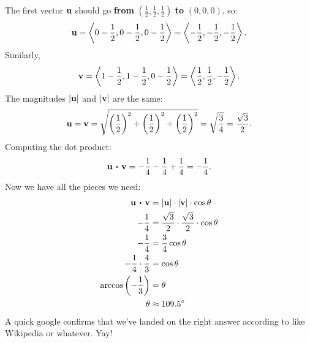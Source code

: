 \begin{enumerate}[leftmargin=0pt]
\begin{red}
    The first vector $\mathbf{u}$ should go \textbf{from} $\left(\frac{1}{2},\frac{1}{2},\frac{1}{2}\right)$  \textbf{to} $(0,0,0)$, so:
    \[\mathbf{u} = \left\langle 0 - \frac{1}{2}, 0 - \frac{1}{2}, 0 - \frac{1}{2} \right\rangle = \left\langle -\frac{1}{2},-\frac{1}{2},-\frac{1}{2}\right\rangle.\]
    Similarly, 
    \[\mathbf{v} = \left\langle 1-\frac{1}{2}, 1-\frac{1}{2}, 0-\frac{1}{2}\right\rangle = \left\langle \frac{1}{2},\frac{1}{2},-\frac{1}{2}\right\rangle.\]
    The magnitudes $|\mathbf{u}|$ and $|\mathbf{v}|$ are the same: 
    \[\mathbf{u} = \mathbf{v} = \sqrt{\left(\frac{1}{2}\right)^2 + 
    \left(\frac{1}{2}\right)^2 + 
    \left(\frac{1}{2}\right)^2} = \sqrt{\frac{3}{4}} = \frac{\sqrt{3}}{2}.\]
    Computing the dot product:
    \[\vu \dotp \vv = -\frac{1}{4} - \frac{1}{4} + \frac{1}{4} = -\frac{1}{4}.\]
    Now we have all the pieces we need:
    \begin{align*}
        \vu\dotp\vv &= |\vu| \cdot |\vv| \cdot \cos\theta \\
        -\frac{1}{4} &= \frac{\sqrt{3}}{2} \cdot \frac{\sqrt{3}}{2} \cdot \cos\theta \\
        -\frac{1}{4} &= \frac{3}{4} \cos\theta \\
        -\frac{1}{4}\cdot\frac{4}{3} &= \cos\theta \\
        \arccos \left(-\frac{1}{3}\right) &= \theta \\
        \theta &\approx 109.5^\circ
    \end{align*}
    A quick google confirms that we've landed on the right answer according to like Wikipedia or whatever. Yay!
    \end{red}
\end{enumerate}

